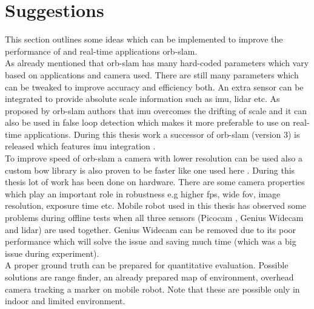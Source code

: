 \section{Suggestions}
This section outlines some ideas which can be implemented to improve the performance of and real-time applications \acrshort{orb}-\acrshort{slam}.\\
\newline As already mentioned that \acrshort{orb}-\acrshort{slam} has many hard-coded parameters which vary based on applications and camera used. There are still many parameters which can be tweaked to improve accuracy and efficiency both. An extra sensor can be integrated to provide absolute scale information such as \acrshort{imu}, \acrshort{lidar} etc. As proposed by \acrshort{orb}-\acrshort{slam} authors \cite{orbslam} that \acrshort{imu} overcomes the drifting of scale and it can also be used in false loop detection which makes it more preferable to use on real-time applications. During this thesis work a successor of \acrshort{orb}-\acrshort{slam} (version 3) is released which features \acrshort{imu} integration \cite{ORBSLAM3}. \\
\newline To improve speed of \acrshort{orb}-\acrshort{slam} a camera with lower resolution can be used also a custom \acrshort{bow} library is also proven to be faster like one used here \cite{Fbow}. During this thesis lot of work has been done on hardware. There are some camera properties which play an important role in robustness e.g higher \acrshort{fps}, wide \acrshort{fov}, image resolution, exposure time etc. Mobile robot used in this thesis has observed some problems during offline tests when all three sensors (Picocam , Genius Widecam and \acrshort{lidar}) are used together. Genius Widecam can be removed due to its poor performance which will solve the issue and saving much time (which was a big issue during experiment). \\
\newline A proper ground truth can be prepared for quantitative evaluation. Possible solutions are range finder, an already prepared map of environment, overhead camera tracking a marker on mobile robot. Note that these are possible only in indoor and limited environment.  